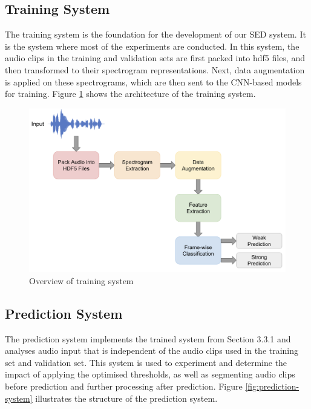 \subsection{Training System}
The training system is the foundation for the development of our SED system. It is the system where most of the experiments are conducted. In this system, the audio clips in the training and validation sets are first packed into hdf5 files, and then transformed to their spectrogram representations. Next, data augmentation is applied on these spectrograms, which are then sent to the CNN-based models for training. Figure \ref{fig:training-system} shows the architecture of the training system.

\begin{figure}[!htb]
    \centering
    \includegraphics[width=\textwidth]{fig/training-system.png}
    \caption{Overview of training system}
    \label{fig:training-system}
\end{figure}

\subsection{Prediction System}
The prediction system implements the trained system from Section 3.3.1 and analyses audio input that is independent of the audio clips used in the training set and validation set. This system is used to experiment and determine the impact of applying the optimised thresholds, as well as segmenting audio clips before prediction and further processing after prediction. Figure \ref{fig:prediction-system} illustrates the structure of the prediction system.

